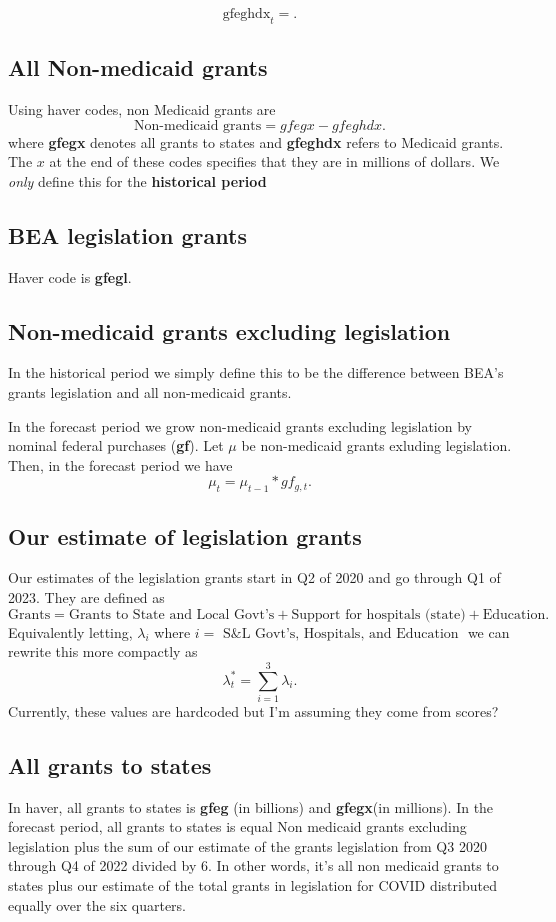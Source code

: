 \documentclass[a4paper]{article}
\begin{document}
\[
\text{gfeghdx}_t= 
.\] 
\subsection{All Non-medicaid grants}
Using haver codes, non Medicaid grants are
\[
\text{Non-medicaid grants} = gfegx - gfeghdx
.\] 
where \textbf{gfegx} denotes all grants to states and \textbf{gfeghdx} refers to Medicaid grants. The $x$ at the end
of these codes specifies that they are in millions of dollars. We \emph{only} define this for the
\textbf{historical period}

\subsection{BEA legislation grants}
Haver code is \textbf{gfegl}. 
\subsection{Non-medicaid grants excluding legislation}
In the historical period we simply define this to be the difference between BEA's grants legislation
 and all non-medicaid grants.

In the forecast period we grow non-medicaid grants excluding legislation by nominal federal
purchases (\textbf{gf}). Let $\mu$ be non-medicaid grants exluding legislation. Then, in the
forecast period we have 
 \[
   \mu_t = \mu_{t-1} * gf_{g, t}
.\] 
\subsection{Our estimate of legislation grants}
Our estimates of the legislation grants start in Q2 of 2020 and go through Q1 of 2023. They are
defined as 
\[
  \text{Grants} = \text{Grants to State and Local Govt's} + \text{Support for hospitals
  (state)}+\text{Education}
.\] 
Equivalently letting, $\lambda_{i}$ where  $i =  \text{ S\&L Govt's, Hospitals, and Education } $
we can rewrite this more compactly as 
\[
  \lambda^{*}_{t} = \sum_{i=1}^{3} \lambda_i 
.\] 
\remark
Currently, these values are hardcoded but I'm assuming they come from scores?
\subsection{All grants to states}

In haver, all grants to states is \textbf{gfeg} (in billions) and \textbf{gfegx}(in millions).
In the forecast period, all grants to states is equal Non medicaid grants excluding legislation plus the sum of our
estimate of the grants legislation from Q3 2020 through Q4 of 2022 divided by 6. In other words,
it's all non medicaid grants to states plus our estimate of the total grants in legislation for
COVID distributed equally over the six quarters. 
\end{document}
